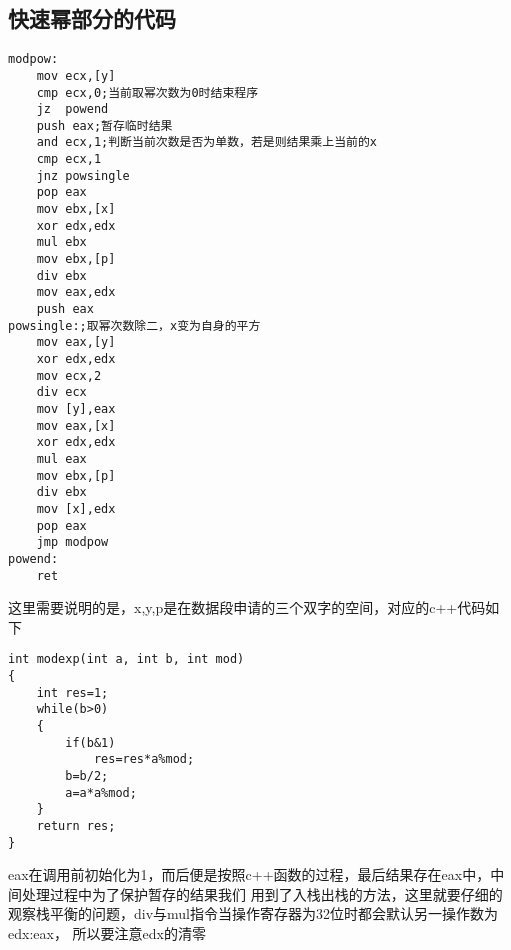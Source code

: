 \documentclass[UTF8]{ctexart}
\begin{document}
\subsection{快速幂部分的代码}
\begin{verbatim}
modpow:
	mov ecx,[y]
	cmp ecx,0;当前取幂次数为0时结束程序
	jz	powend
	push eax;暂存临时结果
	and	ecx,1;判断当前次数是否为单数，若是则结果乘上当前的x
	cmp ecx,1
	jnz powsingle
	pop eax
	mov ebx,[x]
	xor edx,edx
	mul ebx
	mov ebx,[p]
	div ebx
	mov eax,edx
	push eax
powsingle:;取幂次数除二，x变为自身的平方
	mov eax,[y]
	xor edx,edx
	mov ecx,2
	div ecx
	mov [y],eax
	mov eax,[x]
	xor edx,edx
	mul eax
	mov ebx,[p]
	div ebx
	mov [x],edx
	pop eax
	jmp modpow	
powend:
	ret	
\end{verbatim}
这里需要说明的是，x,y,p是在数据段申请的三个双字的空间，对应的c++代码如下
\begin{verbatim}
int modexp(int a, int b, int mod)
{
    int res=1;
    while(b>0)
    {
        if(b&1)
            res=res*a%mod;
        b=b/2;
        a=a*a%mod;
    }
    return res;
}
\end{verbatim}
eax在调用前初始化为1，而后便是按照c++函数的过程，最后结果存在eax中，中间处理过程中为了保护暂存的结果我们
用到了入栈出栈的方法，这里就要仔细的观察栈平衡的问题，div与mul指令当操作寄存器为32位时都会默认另一操作数为edx:eax，
所以要注意edx的清零
\end{document}
